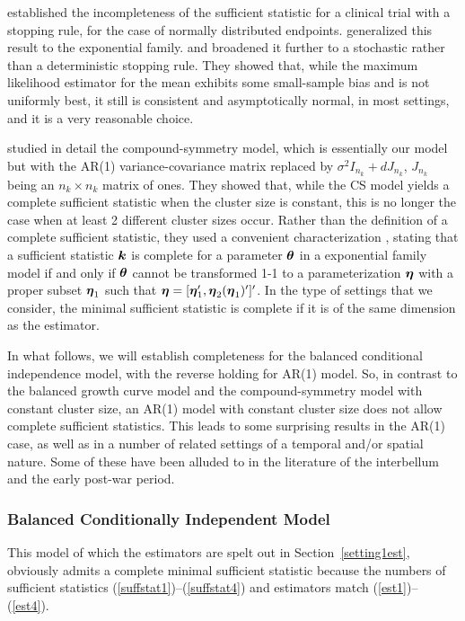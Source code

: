\documentclass[11pt,a5paper,twoside]{book}
\newcommand{\bftheta}{\mbox{\boldmath $\theta$}}
\newcommand{\bk}{\mbox{\boldmath{$k$}}}
\newcommand{\bfeta}{\mbox{\boldmath $\eta$}}
\begin{document}
\cite{liu1999unbiased} established the incompleteness of the sufficient statistic for a clinical trial with a stopping rule, for the case of normally distributed endpoints. \citet{LH06} generalized this result to the exponential family. \citet{molenberghs2014random} and \citet{milanzi2016properties} broadened it further to a stochastic rather than a deterministic stopping rule.
They showed that, while the maximum likelihood estimator for the mean exhibits some small-sample bias and is not uniformly best, it still is consistent and asymptotically normal, in most settings, and it is a very reasonable choice.

\cite{hermans2017_cs} studied in detail the compound-symmetry model, which is essentially our model but with the AR(1) variance-covariance matrix replaced by $\sigma^2I_{n_k}+dJ_{n_k}$, $J_{n_k}$ being an $n_k\times n_k$ matrix of ones. They showed that, while the CS model yields a complete sufficient statistic when the cluster size is constant, this is no longer the case when at least 2 different cluster sizes occur. Rather than the definition of a complete sufficient statistic, they used a convenient characterization \citep{ourselves3}, stating that a sufficient statistic $\bk$ is complete for a parameter $\bftheta$ in a exponential family model if and only if $\bftheta$ cannot be transformed 1-1 to a parameterization $\bfeta$ with a proper subset $\bfeta_1$ such that
$\bfeta=[\bfeta_1',\bfeta_2(\bfeta_1)']'$. In the type of settings that we consider, the minimal sufficient statistic is complete if it is of the same dimension as the estimator.

In what follows, we will establish completeness for the balanced conditional independence model, with the reverse holding for AR(1) model. So, in contrast to the balanced growth curve model and the compound-symmetry model with constant cluster size, an AR(1) model with constant cluster size does not allow complete sufficient statistics. This leads to some surprising results in the AR(1) case, as well as in a number of related settings of a temporal and/or spatial nature. Some of these have been alluded to in the literature of the interbellum and the early post-war period.	



\subsubsection{Balanced Conditionally Independent Model}

This model of which the estimators are spelt out in Section~\ref{setting1est}, obviously admits a complete minimal sufficient statistic because the numbers of sufficient statistics (\ref{suffstat1})--(\ref{suffstat4}) and estimators match (\ref{est1})--(\ref{est4}).
\end{document}

